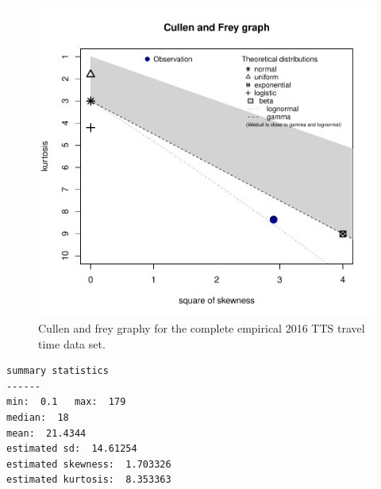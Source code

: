 \documentclass[]{elsarticle} %
\begin{document}
\begin{figure}
\includegraphics[width=1\linewidth]{Spatial-Availability_files/figure-latex/plot-cullen-frey-1} \caption{\label{fig:plot-cullen-frey}Cullen and frey graphy for the complete empirical 2016 TTS travel time data set.}\label{fig:plot-cullen-frey}
\end{figure}

\begin{verbatim}
summary statistics
------
min:  0.1   max:  179 
median:  18 
mean:  21.4344 
estimated sd:  14.61254 
estimated skewness:  1.703326 
estimated kurtosis:  8.353363 
\end{verbatim}
\end{document}
